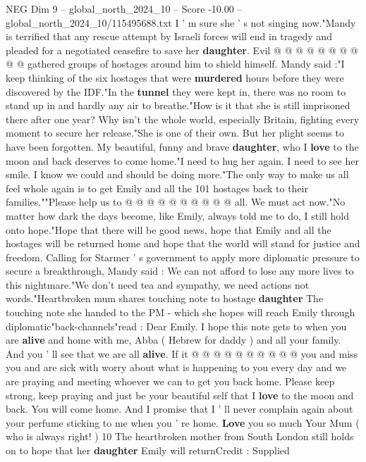 \begin{textsample}{NEG Dim 9 – global\_north\_2024\_10 – Score -10.00 – global\_north\_2024\_10/115495688.txt}
I ' m sure she ' s not singing now."Mandy is terrified that any rescue attempt by Israeli forces will end in tragedy and pleaded for a negotiated ceasefire to save her \textbf{daughter}.
Evil @ @ @ @ @ @ @ @ @ @ gathered groups of hostages around him to shield himself.
Mandy said :"I keep thinking of the six hostages that were \textbf{murdered} hours before they were discovered by the IDF."In the \textbf{tunnel} they were kept in, there was no room to stand up in and hardly any air to breathe."How is it that she is still imprisoned there after one year?
Why isn't the whole world, especially Britain, fighting every moment to secure her release."She is one of their own.
But her plight seems to have been forgotten.
My beautiful, funny and brave \textbf{daughter}, who I \textbf{love} to the moon and back deserves to come home."I need to hug her again.
I need to see her smile.
I know we could and should be doing more."The only way to make us all feel whole again is to get Emily and all the 101 hostages back to their families.""Please help us to @ @ @ @ @ @ @ @ @ @ all.
We must act now."No matter how dark the days become, like Emily, always told me to do, I still hold onto hope."Hope that there will be good news, hope that Emily and all the hostages will be returned home and hope that the world will stand for justice and freedom.
Calling for Starmer ' s government to apply more diplomatic pressure to secure a breakthrough, Mandy said : We can not afford to lose any more lives to this nightmare."We don't need tea and sympathy, we need actions not words."Heartbroken mum shares touching note to hostage \textbf{daughter} The touching note she handed to the PM - which she hopes will reach Emily through diplomatic"back-channels"read : Dear Emily.
I hope this note gets to when you are \textbf{alive} and home with me, Abba ( Hebrew for daddy ) and all your family.
And you ' ll see that we are all \textbf{alive}.
If it @ @ @ @ @ @ @ @ @ @ you and miss you and are sick with worry about what is happening to you every day and we are praying and meeting whoever we can to get you back home.
Please keep strong, keep praying and just be your beautiful self that I \textbf{love} to the moon and back.
You will come home.
And I promise that I ' ll never complain again about your perfume sticking to me when you ' re home. \textbf{Love} you so much Your Mum ( who is always right! ) 10 The heartbroken mother from South London still holds on to hope that her \textbf{daughter} Emily will returnCredit : Supplied

\end{textsample}
